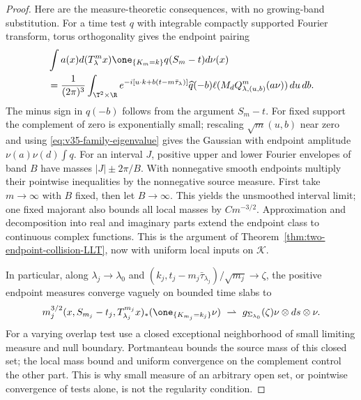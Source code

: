 \begin{proof}
Here are the measure-theoretic consequences, with no growing-band
substitution. For a time test $q$ with integrable compactly supported
Fourier transform, torus orthogonality gives the endpoint pairing
\begin{align*}
 &\int a(x)d(T_\lambda^m x)\one_{\{K_m=k\}}q(S_m-t)d\nu(x)\\
 &=\frac1{(2\pi)^3}\int_{\T^2\times\R}
   e^{-i[u\cdot k+b(t-m\bar\tau_\lambda)]}\widehat q(-b)
                 \ell(M_dQ_{\lambda,(u,b)}^m(a\nu))\,du\,db.
\end{align*}
The minus sign in $\widehat q(-b)$ follows from the argument $S_m-t$.
For fixed support the complement of zero is exponentially small;
rescaling $\sqrt m(u,b)$ near zero and using
\eqref{eq:v35-family-eigenvalue} gives the Gaussian with endpoint
amplitude $\nu(a)\nu(d)\int q$.
For an interval $J$, positive upper and lower Fourier envelopes of
band $B$ have masses $|J|\pm2\pi/B$. With nonnegative smooth endpoints
multiply their pointwise inequalities by the nonnegative source
measure. First take $m\to\infty$ with $B$ fixed, then let $B\to\infty$.
This yields the unsmoothed interval limit; one fixed majorant also
bounds all local masses by $Cm^{-3/2}$. Approximation and decomposition
into real and imaginary parts extend the endpoint class to continuous
complex functions. This is the argument of
Theorem~\ref{thm:two-endpoint-collision-LLT}, now with uniform local
inputs on $\mathcal K$.

In particular, along $\lambda_j\to\lambda_0$ and
$(k_j,t_j-m_j\bar\tau_{\lambda_j})/\sqrt{m_j}\to\zeta$, the positive
endpoint measures converge vaguely on bounded time slabs to
\begin{equation}\label{eq:v35-family-endpoint-measure}
 m_j^{3/2}(x,S_{m_j}-t_j,T_{\lambda_j}^{m_j}x)_*
                (\one_{\{K_{m_j}=k_j\}}\nu)
          \ \rightharpoonup\ g_{\Sigma_{\lambda_0}}(\zeta)\nu\otimes ds\otimes\nu.
\end{equation}
For a varying overlap test use a closed exceptional neighborhood of
small limiting measure and null boundary. Portmanteau bounds the
source mass of this closed set; the local mass bound and uniform
convergence on the complement control the other part. This is why
small measure of an arbitrary open set, or pointwise convergence of
tests alone, is not the regularity condition.


\end{proof}
